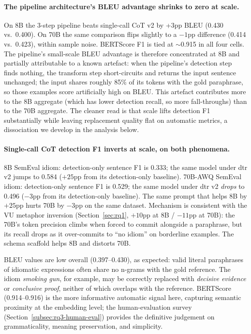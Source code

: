 \paragraph{The pipeline architecture's BLEU advantage shrinks to zero at scale.} On 8B the 3-step pipeline beats single-call CoT v2 by +3pp BLEU (0.430 vs.\ 0.400). On 70B the same comparison flips slightly to a $-1$pp difference (0.414 vs.\ 0.423), within sample noise. BERTScore F1 is tied at $\sim$0.915 in all four cells. The pipeline's small-scale BLEU advantage is therefore concentrated at 8B and partially attributable to a known artefact: when the pipeline's detection step finds nothing, the transform step short-circuits and returns the input sentence unchanged; the input shares roughly 85\% of its tokens with the gold paraphrase, so those examples score artificially high on BLEU. This artefact contributes more to the 8B aggregate (which has lower detection recall, so more fall-throughs) than to the 70B aggregate. The cleaner read is that scale lifts detection F1 substantially while leaving replacement quality flat on automatic metrics, a dissociation we develop in the analysis below.

\paragraph{Single-call CoT detection F1 inverts at scale, on both phenomena.} 8B SemEval idiom: detection-only sentence F1 is 0.333; the same model under dtr v2 jumps to 0.584 ($+25$pp from its detection-only baseline). 70B-AWQ SemEval idiom: detection-only sentence F1 is 0.529; the same model under dtr v2 \emph{drops} to 0.496 ($-3$pp from its detection-only baseline). The same prompt that helps 8B by $+25$pp hurts 70B by $-3$pp on the same dataset. Mechanism is consistent with the VU metaphor inversion (Section~\ref{sec:rq1}, $+10$pp at 8B / $-11$pp at 70B): the 70B's token precision climbs when forced to commit alongside a paraphrase, but its recall drops as it over-commits to ``no idiom'' on borderline examples. The schema scaffold helps 8B and distorts 70B.

BLEU values are low overall (0.397--0.430), as expected: valid literal paraphrases of idiomatic expressions often share no n-grams with the gold reference. The idiom \textit{smoking gun}, for example, may be correctly replaced with \textit{decisive evidence} or \textit{conclusive proof}, neither of which overlaps with the reference. BERTScore (0.914--0.916) is the more informative automatic signal here, capturing semantic proximity at the embedding level; the human-evaluation survey (Section~\ref{subsec:rq3-human-eval}) provides the definitive judgement on grammaticality, meaning preservation, and simplicity.

